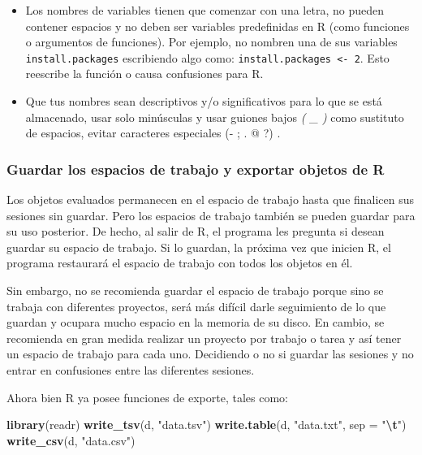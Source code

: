 \documentclass[
]{book}
\newenvironment{Shaded}{\begin{snugshade}}{\end{snugshade}}
\newcommand{\AttributeTok}[1]{\textcolor[rgb]{0.13,0.29,0.53}{#1}}
\newcommand{\FunctionTok}[1]{\textcolor[rgb]{0.13,0.29,0.53}{\textbf{#1}}}
\newcommand{\NormalTok}[1]{#1}
\newcommand{\SpecialCharTok}[1]{\textcolor[rgb]{0.81,0.36,0.00}{\textbf{#1}}}
\newcommand{\StringTok}[1]{\textcolor[rgb]{0.31,0.60,0.02}{#1}}
\begin{document}
\begin{itemize}
\item
  Los nombres de variables tienen que comenzar con una letra, no pueden contener espacios y no deben ser variables predefinidas en R (como funciones o argumentos de funciones).
  Por ejemplo, no nombren una de sus variables \texttt{install.packages} escribiendo algo como: \texttt{install.packages\ \textless{}-\ 2}.
  Esto reescribe la función o causa confusiones para R.
\item
  Que tus nombres sean descriptivos y/o significativos para lo que se está almacenado, usar solo minúsculas y usar guiones bajos \emph{( \_ )} como sustituto de espacios, evitar caracteres especiales (- ; . @ ?) .
\end{itemize}

\subsubsection{Guardar los espacios de trabajo y exportar objetos de R}\label{guardar-los-espacios-de-trabajo-y-exportar-objetos-de-r}

Los objetos evaluados permanecen en el espacio de trabajo hasta que finalicen sus sesiones sin guardar.
Pero los espacios de trabajo también se pueden guardar para su uso posterior.
De hecho, al salir de R, el programa les pregunta si desean guardar su espacio de trabajo.
Si lo guardan, la próxima vez que inicien R, el programa restaurará el espacio de trabajo con todos los objetos en él.

Sin embargo, no se recomienda guardar el espacio de trabajo porque sino se trabaja con diferentes proyectos, será más difícil darle seguimiento de lo que guardan y ocupara mucho espacio en la memoria de su disco.
En cambio, se recomienda en gran medida realizar un proyecto por trabajo o tarea y así tener un espacio de trabajo para cada uno.
Decidiendo o no si guardar las sesiones y no entrar en confusiones entre las diferentes sesiones.

Ahora bien R ya posee funciones de exporte, tales como:

\begin{Shaded}
\begin{Highlighting}[]
\FunctionTok{library}\NormalTok{(readr)}
\FunctionTok{write\_tsv}\NormalTok{(d, }\StringTok{"data.tsv"}\NormalTok{)}
\FunctionTok{write.table}\NormalTok{(d, }\StringTok{"data.txt"}\NormalTok{, }\AttributeTok{sep =} \StringTok{"}\SpecialCharTok{\textbackslash{}t}\StringTok{"}\NormalTok{)}
\FunctionTok{write\_csv}\NormalTok{(d, }\StringTok{"data.csv"}\NormalTok{)}
\end{Highlighting}
\end{Shaded}
\end{document}

